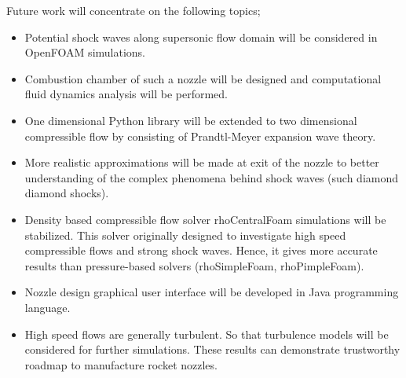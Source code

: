 Future work will concentrate on the following topics;
\begin{itemize}
	\item Potential shock waves along supersonic flow domain will be considered in OpenFOAM simulations.
	\item Combustion chamber of such a nozzle will be designed and computational fluid dynamics analysis will be performed.
	\item One dimensional Python library will be extended to two dimensional compressible flow by consisting of Prandtl-Meyer expansion wave theory.
	\item More realistic approximations will be made at exit of the nozzle to better understanding of the complex phenomena behind shock waves (such diamond diamond shocks).
	\item Density based compressible flow solver rhoCentralFoam simulations will be stabilized. This solver originally designed to investigate high speed compressible flows and strong shock waves. Hence, it gives more accurate results than pressure-based solvers (rhoSimpleFoam, rhoPimpleFoam).
	\item Nozzle design graphical user interface will be developed in Java programming language.
	\item High speed flows are generally turbulent. So that turbulence models will be considered for further simulations. These results can demonstrate trustworthy roadmap to manufacture rocket nozzles.
\end{itemize} 

